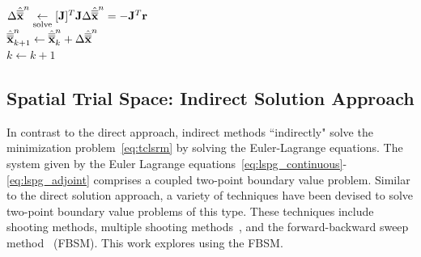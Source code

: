 \begin{algorithm}
{%
$\Delta \hat{\overline{\overline{\mathbf {x}}}}^{n} \underset{\text{solve}}{\leftarrow} [\mathbf{J}]^T \mathbf{J} \Delta \hat{\overline{\overline{\mathbf {x}}}}^{n}=  -\mathbf{J}^T\mathbf{r}$  \\
$\hat{\overline{\overline{\mathbf {x}}}}^{n}_{k+1} \leftarrow \hat{\overline{\overline{\mathbf {x}}}}^{n}_k + \Delta \hat{\overline{\overline{\mathbf {x}}}}^{n}$  \\
$k\leftarrow k+1$
}
\end{algorithm}


%

\subsection{Spatial Trial Space: Indirect Solution Approach}\label{sec:indirect}
In contrast to the direct approach,
indirect methods ``indirectly" solve the minimization
problem~\eqref{eq:tclsrm} by solving the Euler-Lagrange equations. The
system given by the Euler Lagrange equations~\eqref{eq:lspg_continuous}-\eqref{eq:lspg_adjoint} comprises a coupled two-point boundary value
problem. Similar to the direct solution approach, a variety of techniques have
been devised to solve two-point boundary value problems of this type. These
techniques include shooting methods, multiple shooting
methods~\cite{multiple_shooting}, and the forward-backward sweep
method~\cite{fbs} (FBSM).  This work explores using the FBSM. 


